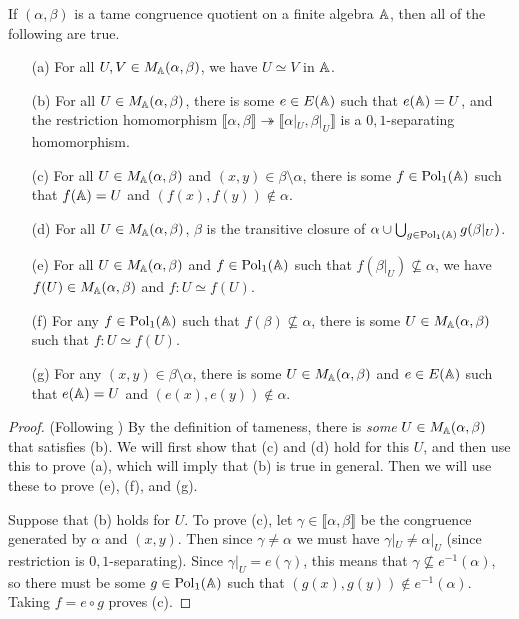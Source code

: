 \begin{appendices}
\begin{thm}\label{thm-minimal-sets} If $(\alpha,\beta)$ is a tame congruence quotient on a finite algebra $\mathbb{A}$, then all of the following are true.
\begin{itemize}
\item[(a)] For all $U,V \in M_{\mathbb{A}}(\alpha,\beta)$, we have $U \simeq V$ in $\mathbb{A}$.

\item[(b)] For all $U \in M_{\mathbb{A}}(\alpha,\beta)$, there is some $e \in E(\mathbb{A})$ such that $e(\mathbb{A}) = U$, and the restriction homomorphism $\llbracket \alpha, \beta \rrbracket \twoheadrightarrow \llbracket \alpha|_U, \beta|_U \rrbracket$ is a $0,1$-separating homomorphism.

\item[(c)] For all $U \in M_{\mathbb{A}}(\alpha, \beta)$ and $(x,y) \in \beta\setminus\alpha$, there is some $f \in \operatorname{Pol}_1(\mathbb{A})$ such that $f(\mathbb{A}) = U$ and $(f(x),f(y)) \not\in \alpha$.

\item[(d)] For all $U \in M_{\mathbb{A}}(\alpha, \beta)$, $\beta$ is the transitive closure of $\alpha \cup \bigcup_{g \in \operatorname{Pol}_1(\mathbb{A})} g(\beta|_U)$.

\item[(e)] For all $U \in M_{\mathbb{A}}(\alpha, \beta)$ and $f \in \operatorname{Pol}_1(\mathbb{A})$ such that $f(\beta|_U) \not\subseteq \alpha$, we have $f(U) \in M_{\mathbb{A}}(\alpha, \beta)$ and $f : U \simeq f(U)$.

\item[(f)] For any $f \in \operatorname{Pol}_1(\mathbb{A})$ such that $f(\beta) \not\subseteq \alpha$, there is some $U \in M_{\mathbb{A}}(\alpha,\beta)$ such that $f : U \simeq f(U)$.

\item[(g)] For any $(x,y) \in \beta\setminus\alpha$, there is some $U \in M_{\mathbb{A}}(\alpha, \beta)$ and $e \in E(\mathbb{A})$ such that $e(\mathbb{A}) = U$ and $(e(x), e(y)) \not\in \alpha$.
\end{itemize}
\end{thm}
\begin{proof} (Following \cite{hobby-mckenzie}) By the definition of tameness, there is \emph{some} $U \in M_{\mathbb{A}}(\alpha, \beta)$ that satisfies (b). We will first show that (c) and (d) hold for this $U$, and then use this to prove (a), which will imply that (b) is true in general. Then we will use these to prove (e), (f), and (g).

Suppose that (b) holds for $U$. To prove (c), let $\gamma \in \llbracket \alpha, \beta \rrbracket$ be the congruence generated by $\alpha$ and $(x,y)$. Then since $\gamma \ne \alpha$ we must have $\gamma|_U \ne \alpha|_U$ (since restriction is $0,1$-separating). Since $\gamma|_U = e(\gamma)$, this means that $\gamma \not\subseteq e^{-1}(\alpha)$, so there must be some $g \in \operatorname{Pol}_1(\mathbb{A})$ such that $(g(x), g(y)) \not\in e^{-1}(\alpha)$. Taking $f = e\circ g$ proves (c).


\end{proof}
\end{appendices}
